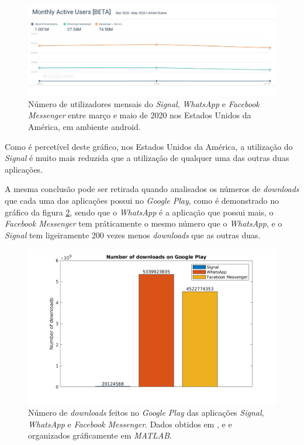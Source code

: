 \begin{figure}[H]
   \begin{center}
       \includegraphics[width=17cm]{img/Monthly Active Users [BETA] (2020_06_10_2020_06_10).png}
       \caption{Número de utilizadores mensais do \textit{Signal}, \textit{WhatsApp} e \textit{Facebook Messenger} entre março e maio de 2020 nos Estados Unidos da América, em ambiente android. \cite{all_monthly_users}}
       \label{graph:all_monthly_active}
   \end{center}
\end{figure}

Como é percetível deste gráfico, nos Estados Unidos da América, a utilização do \textit{Signal} é muito mais reduzida que a utilização de qualquer uma das outras duas aplicações.

A mesma conclusão pode ser retirada quando analisados os números de \textit{downloads} que cada uma das aplicações possui no \textit{Google Play}, como é demonstrado no gráfico da figura \ref{graph:downloads_all_time}, sendo que o \textit{WhatsApp} é a aplicação que possui mais, o \textit{Facebook Messenger} tem práticamente o mesmo número que o \textit{WhatsApp}, e o \textit{Signal} tem ligeiramente 200 vezes menos \textit{downloads} que as outras duas.

\begin{figure}[H]
   \begin{center}
       \includegraphics[width=15cm]{img/all_downloads.png}
       \caption{Número de \textit{downloads} feitos no \textit{Google Play} das aplicações \textit{Signal}, \textit{WhatsApp} e \textit{Facebook Messenger}. Dados obtidos em \cite{signal_android}, \cite{whatsapp_downloads_android} e \cite{messenger_downloads_android} e organizados gráficamente em \textit{MATLAB}.}
       \label{graph:downloads_all_time}
   \end{center}
\end{figure}

